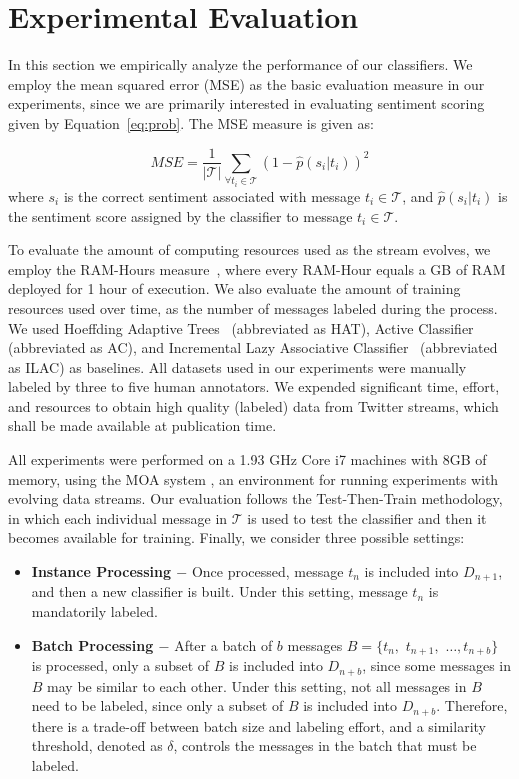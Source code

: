 \section{Experimental Evaluation}

In this section we empirically analyze the performance of our classifiers. We employ the mean squared error (MSE) as the basic evaluation measure in our experiments, since we are primarily interested in evaluating sentiment scoring given by Equation~\ref{eq:prob}. The MSE measure is given as: 

\begin{equation}
\label{rmse}
\mathit{MSE} = \displaystyle\frac{1}{|\mathcal{T}|} \displaystyle\sum_{\forall t_i\in\mathcal{T}} (1 - \hat{p}(s_i|t_i))^2
\end{equation}
\noindent where $s_i$ is the correct sentiment associated with message $t_i\in\mathcal{T}$, and $\hat{p}(s_i|t_i)$ is the sentiment score assigned by the classifier to message $t_i\in\mathcal{T}$.

To evaluate the amount of computing resources used as the stream evolves, we employ the RAM-Hours measure~\cite{Bifet:2010:FPD:2144032.2144069}, where every RAM-Hour equals a GB of RAM deployed for 1 hour of execution. We also evaluate the amount of training resources used over time, as the number of messages labeled during the process. We used Hoeffding Adaptive Trees~\cite{bifetsent1,bifetsent2} (abbreviated as HAT), Active Classifier~\cite{6414645,Indre2011k} (abbreviated as AC), and Incremental Lazy Associative Classifier~\cite{sigir} (abbreviated as ILAC) as baselines. All datasets used in our experiments were manually labeled by three to five human annotators.
We expended significant time, effort,
and resources to obtain high quality (labeled) data from Twitter streams,
which shall be made available at publication time.

All experiments were performed on a 1.93 GHz Core i7 machines with 8GB of memory, using the MOA system \cite{moa}, an environment for running experiments with evolving data streams.
Our evaluation follows the Test-Then-Train methodology, in which 
each individual message in $\mathcal{T}$ is used to test the classifier
and then it becomes available for training.
Finally, we consider three possible settings:
\begin{itemize}
\item{\bf{Instance Processing $-$}}
Once processed, message $t_n$ is included into $D_{n+1}$, and then a new classifier is built. Under this setting, message $t_n$ is mandatorily labeled.
\item{\bf{Batch Processing $-$}}
After a batch of $b$ messages $B=\{t_n,$ $t_{n+1},$ $\ldots, t_{n+b}\}$ is processed, only a subset of $B$ is included into $D_{n+b}$, since some messages in $B$ may be similar to each other. Under this setting, not all messages in $B$ need to be labeled, since only a subset of $B$ is included into $D_{n+b}$. Therefore, there is a trade-off between batch size and labeling effort, and a similarity threshold, denoted as $\delta$, controls the messages in the batch that must be labeled.
\end{itemize}

